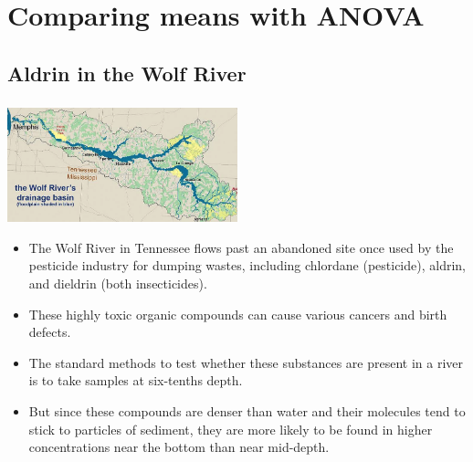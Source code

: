 \documentclass[notes,11pt, aspectratio=169]{beamer}
\begin{document}


\section{Comparing means with ANOVA}


\subsection{Aldrin in the Wolf River}


\begin{frame}
\frametitle{}

\begin{center}
\includegraphics[width=0.5\textwidth]{graphs/wolf}
\end{center}

{\small
\begin{itemize}

\item  The Wolf River in Tennessee flows past an abandoned site once used by the pesticide industry for dumping wastes, including chlordane (pesticide), aldrin, and dieldrin (both insecticides).

\pause

\item These highly toxic organic compounds can cause various cancers and birth defects.

\pause

\item The standard methods to test whether these substances are present in a river is to take samples at six-tenths depth. 

\pause

\item But since these compounds are denser than water and their molecules tend to stick to particles of sediment, they are more likely to be found in higher concentrations near the bottom than near mid-depth.

\end{itemize}
}

\end{frame}
\end{document}
